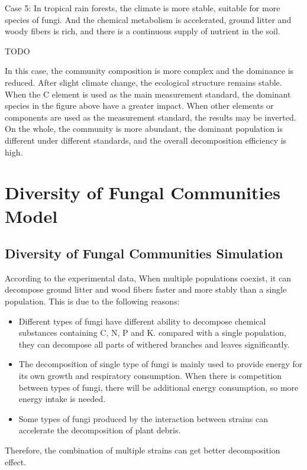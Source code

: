 \documentclass{mcmthesis}
\begin{document}
Case 5: In tropical rain forests, the climate is more stable, suitable for more species of fungi. And the chemical metabolism is accelerated, ground litter and woody fibers is rich, and there is a continuous supply of nutrient in the soil.

TODO

In this case, the community composition is more complex and the dominance is reduced. After slight climate change, the ecological structure remains stable. When the C element is used as the main measurement standard, the dominant species in the figure above have a greater impact. When other elements or components are used as the measurement standard, the results may be inverted. On the whole, the community is more abundant, the dominant population is different under different standards, and the overall decomposition efficiency is high.

\section{Diversity of Fungal Communities Model}

\subsection{Diversity of Fungal Communities Simulation}

According to the experimental data\cite{maynard2019consistent}, When multiple populations coexist, it can decompose ground litter and wood fibers faster and more stably than a single population. This is due to the following reasons:

\begin{itemize}
  \item Different types of fungi have different ability to decompose chemical substances containing C, N, P and K. compared with a single population, they can decompose all parts of withered branches and leaves significantly.
  \item The decomposition of single type of fungi is mainly used to provide energy for its own growth and respiratory consumption. When there is competition between types of fungi, there will be additional energy consumption, so more energy intake is needed.
  \item Some types of fungi produced by the interaction between strains can accelerate the decomposition of plant debris.
\end{itemize}

Therefore, the combination of multiple strains can get better decomposition effect.
\end{document}
